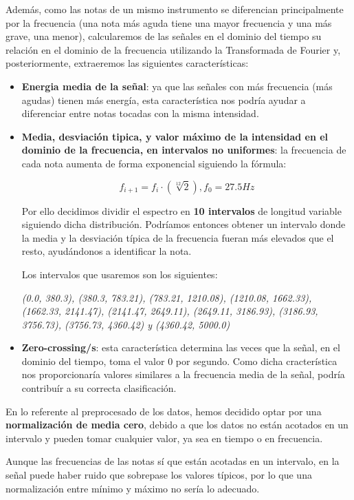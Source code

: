 \documentclass[12pt]{article}
\begin{document}
\bigskip
Además, como las notas de un mismo instrumento se diferencian principalmente por la frecuencia (una nota más aguda tiene una mayor frecuencia
y una más grave, una menor), calcularemos de las señales en el dominio del tiempo su relación en el dominio de la frecuencia utilizando la
Transformada de Fourier y, posteriormente, extraeremos las siguientes características:
\begin{itemize}
	\item \textbf{Energia media de la señal}: ya que las señales con más frecuencia (más agudas) tienen más energía, esta característica nos podría
		ayudar a diferenciar entre notas tocadas con la misma intensidad.
	\item \textbf{Media, desviación tipica, y valor máximo de la intensidad en el dominio de la frecuencia, en intervalos no uniformes}: la frecuencia de cada nota
		aumenta de forma exponencial siguiendo la fórmula:

		\begin{equation}
			f_{i+1} = f_{i}\cdot(\sqrt[12]{2}), f_0 = 27.5 Hz
		\end{equation}

		Por ello decidimos dividir el espectro en \textbf{10 intervalos} de longitud variable siguiendo dicha distribución. 
		Podríamos entonces obtener un intervalo donde la media y la desviación típica de la frecuencia fueran más elevados que el resto,
		ayudándonos a identificar la nota.
		
		Los intervalos que usaremos son los siguientes:
		
		\textit{(0.0, 380.3), (380.3, 783.21), (783.21, 1210.08), (1210.08, 1662.33),\newline
		(1662.33, 2141.47), (2141.47, 2649.11), (2649.11, 3186.93), (3186.93, 3756.73), 
		(3756.73, 4360.42) y (4360.42, 5000.0)}
	\item \textbf{Zero-crossing/s}: esta característica determina las veces que la señal, en el dominio del tiempo, toma el valor 0 por segundo.
		Como dicha cracterística nos proporcionaría valores similares a la frecuencia media de la señal, podría contribuír a su correcta clasificación.
\end{itemize}

\bigskip
En lo referente al preprocesado de los datos, hemos decidido optar por una \textbf{normalización de media cero},
debido a que los datos no están acotados en un intervalo y pueden tomar cualquier valor, ya sea
en tiempo o en frecuencia.

Aunque las frecuencias de las notas sí que están acotadas en un intervalo, en la señal
puede haber ruido que sobrepase los valores típicos, por lo que una normalización entre mínimo y máximo no sería lo adecuado.
\end{document}

